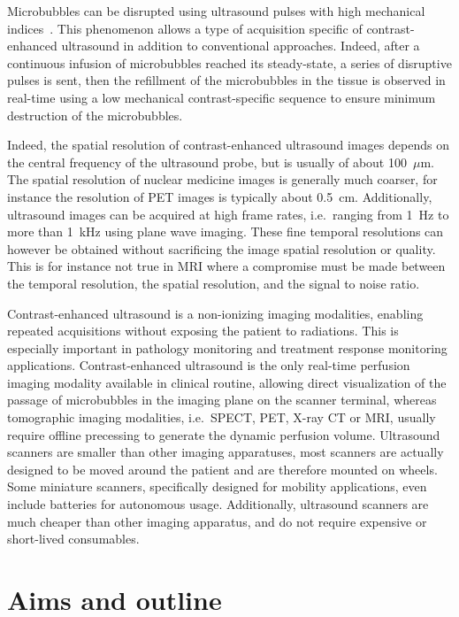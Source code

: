 Microbubbles can be disrupted using ultrasound pulses with high mechanical indices~\cite{Tiemann:1999vy}.
This phenomenon allows a type of acquisition specific of contrast-enhanced ultrasound in addition to conventional approaches. 
Indeed, after a continuous infusion of microbubbles reached its steady-state, a series of disruptive pulses is sent, then the refillment of the microbubbles in the tissue is observed in real-time using a low mechanical contrast-specific sequence to ensure minimum destruction of the microbubbles.

Indeed, the spatial resolution of contrast-enhanced ultrasound images depends on the central frequency of the ultrasound probe, but is usually of about 100~$\mu$m.
The spatial resolution of nuclear medicine images is generally much coarser, for instance the resolution of PET images is typically about 0.5~cm.
Additionally, ultrasound images can be acquired at high frame rates, i.e.~ranging from 1~Hz to more than 1~kHz using plane wave imaging.
These fine temporal resolutions can however be obtained without sacrificing the image spatial resolution or quality. 
This is for instance not true in MRI where a compromise must be made between the temporal resolution, the spatial resolution, and the signal to noise ratio.

Contrast-enhanced ultrasound is a non-ionizing imaging modalities, enabling repeated acquisitions without exposing the patient to radiations.
This is especially important in pathology monitoring and treatment response monitoring applications.
Contrast-enhanced ultrasound is the only real-time perfusion imaging modality available in clinical routine, allowing direct visualization of the passage of microbubbles in the imaging plane on the scanner terminal, whereas tomographic imaging modalities, i.e.~SPECT, PET, X-ray CT or MRI, usually require offline precessing to generate the dynamic perfusion volume.
Ultrasound scanners are smaller than other imaging apparatuses, most scanners are actually designed to be moved around the patient and are therefore mounted on wheels.
Some miniature scanners, specifically designed for mobility applications, even include batteries for autonomous usage.
Additionally, ultrasound scanners are much cheaper than other imaging apparatus, and do not require expensive or short-lived consumables.

\section{Aims and outline}
\label{sec:IntroAimsOutline}
